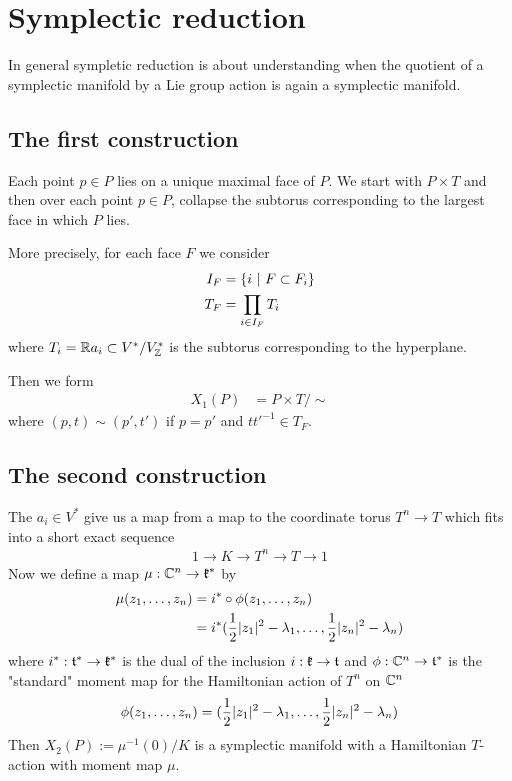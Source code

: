 \documentclass[12pt]{article}
\begin{document}
\section{Symplectic reduction}
In general sympletic reduction is about understanding when the quotient
of a symplectic manifold by a Lie group action is again a symplectic manifold.

\subsection{The first construction}
Each point $p\in P$ lies on a unique maximal face of $P$. We start with $P\times T$ and
then over each point $p\in P$, collapse the subtorus corresponding to the largest face in which $P$ lies.

\hfill

More precisely, for each face $F$ we consider \begin{align*}
	I_F & = \{i \ \vert \  F\subset F_i\} \\
	T_F & = \prod_{i\in I_F} T_i
\end{align*} where $T_i = \mathbb{R} a_i\subset V^*/V_{\mathbb{Z}}^*$ is the subtorus corresponding
to the hyperplane.

Then we form \begin{align*}
	X_1(P) & = P\times T/\sim
\end{align*} where $(p,t)\sim (p',t')$ if $p = p'$ and $tt'^{-1}\in T_F$.

\subsection{The second construction}
The $a_i\in V^*$ give us a map from a map to the coordinate torus $T^n\to T$
which fits into a short exact sequence
\begin{align*}
	1 \to K \to T^n \to T \to 1
\end{align*}
Now we define a map $\mu:\mathbb{C}^n\to \mathfrak{k}^*$ by \begin{align*}
	\mu(z_1,\dots,z_n) & = i^*\circ \phi(z_1,\dots,z_n)                                   \\
	                   & = i^*(\frac{1}{2} |z_1|^2 - \lambda_1,\dots,\frac{1}{2} |z_n|^2 - \lambda_n)
\end{align*} where $i^*:\mathfrak{t}^*\to \mathfrak{k}^*$ is the dual of the inclusion $i:\mathfrak{k}\to \mathfrak{t}$
and $\phi:\mathbb{C}^n\to \mathfrak{t}^*$ is the "standard" moment map for the Hamiltonian action of $T^n$ on $\mathbb{C}^n$ \begin{align*}
	\phi(z_1,\dots,z_n) = (\frac{1}{2} |z_1|^2 - \lambda_1,\dots,\frac{1}{2} |z_n|^2 - \lambda_n)
\end{align*}
Then $X_2(P) := \mu^{-1}(0)/K$ is a symplectic manifold with a Hamiltonian $T$-action with moment
map $\mu$.
\end{document}

